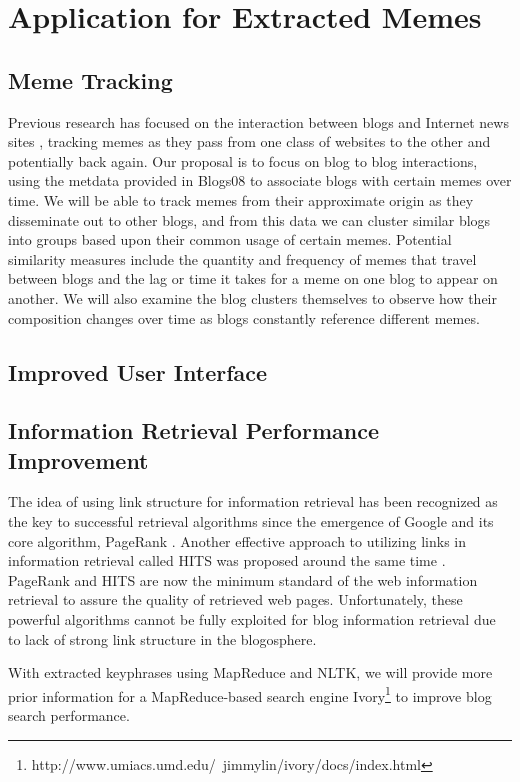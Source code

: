 \documentclass{sig-alternate}
\begin{document}
\section{Application for Extracted Memes}

\subsection{Meme Tracking}

Previous research has focused on the interaction between blogs and Internet news sites \cite{Leskovec2009}, tracking memes as they pass from one class of websites to the other and potentially back again. Our proposal is to focus on blog to blog interactions, using the metdata provided in Blogs08 to associate blogs with certain memes over time.  We will be able to track memes from their approximate origin as they disseminate out to other blogs, and from this data we can cluster similar blogs into groups based upon their common usage of certain memes. Potential similarity measures include the quantity and frequency of memes that travel between blogs and the lag or time it takes for a meme on one blog to appear on another. We will also examine the blog clusters themselves to observe how their composition changes over time as blogs constantly reference different memes.
 
\subsection{Improved User Interface}

\subsection{Information Retrieval Performance Improvement}

The idea of using link structure for information retrieval has been recognized as the key to successful retrieval algorithms since the emergence of Google and its core algorithm, PageRank \cite{Brin1998a}. Another effective approach to utilizing links in information retrieval called HITS was proposed around the same time \cite{Kleinberg1999}.  PageRank and HITS are now the minimum standard of the web information retrieval to assure the quality of retrieved web pages. Unfortunately, these powerful algorithms cannot be fully exploited for blog information retrieval due to lack of strong link structure in the blogosphere. 

With extracted keyphrases using MapReduce and NLTK, we will provide more prior information for a MapReduce-based search engine Ivory\footnote{http://www.umiacs.umd.edu/~jimmylin/ivory/docs/index.html} to improve blog search performance.
\end{document}
